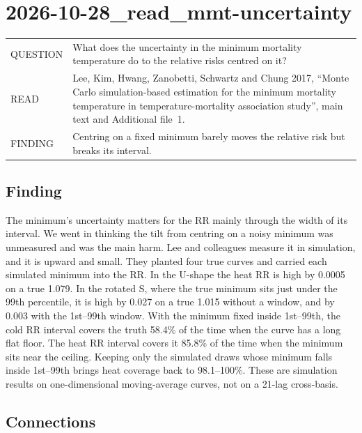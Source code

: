 \documentclass[11pt]{article}
\begin{document}
\section*{2026-10-28\_read\_mmt-uncertainty}

\begin{tabular}{@{}p{}p{}@{}}
QUESTION & What does the uncertainty in the minimum mortality temperature do to the relative risks centred on it? \\[4pt]
READ & Lee, Kim, Hwang, Zanobetti, Schwartz and Chung 2017, ``Monte Carlo simulation-based estimation for the minimum mortality temperature in temperature-mortality association study'', main text and Additional file~1. \\[4pt]
FINDING & Centring on a fixed minimum barely moves the relative risk but breaks its interval. \\
\end{tabular}

\subsection*{Finding}

The minimum's uncertainty matters for the RR mainly through the width of its interval.
We went in thinking the tilt from centring on a noisy minimum was unmeasured and was the main harm.
Lee and colleagues measure it in simulation, and it is upward and small.
They planted four true curves and carried each simulated minimum into the RR.
In the U-shape the heat RR is high by 0.0005 on a true 1.079.
In the rotated S, where the true minimum sits just under the 99th percentile, it is high by 0.027 on a true 1.015 without a window, and by 0.003 with the 1st--99th window.
With the minimum fixed inside 1st--99th, the cold RR interval covers the truth 58.4\% of the time when the curve has a long flat floor.
The heat RR interval covers it 85.8\% of the time when the minimum sits near the ceiling.
Keeping only the simulated draws whose minimum falls inside 1st--99th brings heat coverage back to 98.1--100\%.
These are simulation results on one-dimensional moving-average curves, not on a 21-lag cross-basis.

\subsection*{Connections}
\end{document}

